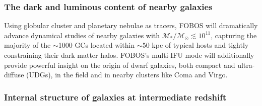 
\subsubsection{The dark and luminous content of nearby galaxies}

Using globular cluster and planetary nebulae as tracers, FOBOS will
dramatically advance dynamical studies of nearby galaxies with
$\mathcal{M_\ast/M_\odot} \lesssim 10^{11}$, capturing the majority
of the $\sim$1000 GCs located within $\sim$50 kpc of typical hosts
\citep[see][]{2013ApJ...772...82H} and tightly constraining their
dark matter halos. FOBOS's multi-IFU mode will additionally provide
powerful insight on the origin of dwarf galaxies, both compact and
ultra-diffuse (UDGs), in the field and in nearby clusters like Coma
and Virgo.




\subsubsection{Internal structure of galaxies at intermediate redshift}

